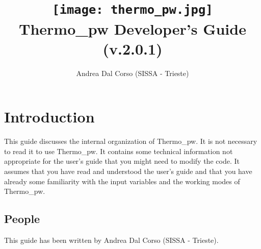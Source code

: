 \documentclass[12pt,a4paper,twoside]{report}
\def\version{2.0.1}
\def\tpw{{\sc Thermo}\_{\sc pw}}
\begin{document}
 

\author{Andrea Dal Corso (SISSA - Trieste)}
\date{}

\title{
  \texttt{[image: thermo\_pw.jpg]} \\
  \vspace{3truecm}
  \Huge \color{dark-blue} {\sc Thermo}\_{\sc pw} Developer's Guide \\
  (v.\version)
}

\maketitle

\newpage

\tableofcontents

\newpage

{\color{dark-blue}\chapter{Introduction}}
\color{black}
This guide discusses the internal organization of \tpw. It is not necessary
to read it to use \tpw. It contains some technical information not 
appropriate for the user's guide that you might need to modify the code.
It assumes that you have read and understood the user's guide and that
you have already some familiarity with the input variables and 
the working modes of \tpw.

{\color{coral}\section{People}}
\color{black}
This guide has been written by Andrea Dal Corso (SISSA - Trieste). 
\end{document}
